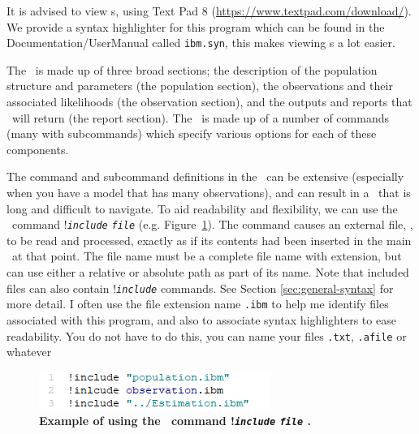 It is advised to view \config s, using Text Pad 8 (\url{https://www.textpad.com/download/}). We provide a syntax highlighter for this program which can be found in the Documentation/UserManual called \texttt{ibm.syn}, this makes viewing \config s a lot easier. 


The \config\ is made up of three broad sections; the description of the population structure and parameters (the population section), the observations and their associated likelihoods (the observation section), and the outputs and reports that \IBM\ will return (the report section). The \config\ is made up of a number of commands (many with subcommands) which specify various options for each of these components.

The command and subcommand definitions in the \config\ can be extensive (especially when you have a model that has many observations), and can result in a \config\ that is long and difficult to navigate. To aid readability and flexibility, we can use the \config\ command !\texttt{\emph{include}} \texttt{\emph{file}}  (e.g. Figure~\ref{fig:config_file_1}). The command causes an external file, , to be read and processed, exactly as if its contents had been inserted in the main \config\ at that point. The file name must be a complete file name with extension, but can use either a relative or absolute path as part of its name. Note that included files can also contain !\texttt{\emph{include}} commands. See Section \ref{sec:general-syntax} for more detail. I often use the file extension name \texttt{.ibm} to help me identify files associated with this program, and also to associate syntax highlighters to ease readability. You do not have to do this, you can name your files \texttt{.txt}, \texttt{.afile} or whatever


\vspace*{3mm}
\begin{figure}[H]
	\includegraphics[scale=1]{Figures/config.png}
	\caption{\textbf{Example of using the \config\ command !\texttt{\emph{include}}
			\texttt{\emph{file}} .}}\label{fig:config_file_1}
\end{figure}

\subsection{\label{sec:redirecting-stdout}}

